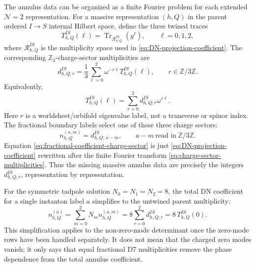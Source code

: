 \documentclass[11pt]{article}
\newcommand{\Z}{\mathbb{Z}}
\newcommand{\Tr}{\operatorname{Tr}}
\begin{document}
The annulus data can be organized as a finite Fourier problem for each extended
\(\mathcal N=2\) representation. For a massive representation \((h,Q)\) in the parent ordered
\(I\to S\) internal Hilbert space, define the three twined traces
\begin{equation}
  T_{h,Q}^{IS}(\ell)
  =
  \Tr_{\mathcal R_{h,Q}^{IS}}\!\left(g^\ell\right),
  \qquad
  \ell=0,1,2,
  \label{eq:twined-massive-traces}
\end{equation}
where \(\mathcal R_{h,Q}^{IS}\) is the multiplicity space used in
\eqref{eq:DN-projection-coefficient}. The corresponding \(\Z_3\)-charge-sector multiplicities
are
\begin{equation}
  d_{h,Q;r}^{IS}
  =
  \frac{1}{3}\sum_{\ell=0}^{2}\omega^{-r\ell}T_{h,Q}^{IS}(\ell),
  \qquad
  r\in\Z/3\Z.
  \label{eq:charge-sector-multiplicities}
\end{equation}
Equivalently,
\begin{equation}
  T_{h,Q}^{IS}(\ell)
  =
  \sum_{r=0}^{2}d_{h,Q;r}^{IS}\omega^{r\ell}.
  \label{eq:inverse-charge-sector-transform}
\end{equation}
Here \(r\) is a worldsheet/orbifold eigenvalue label, not a transverse or spinor index. The
fractional boundary labels select one of these three charge sectors:
\begin{equation}
  n_{h,Q}^{(a,m)}
  =
  d_{h,Q;\,a-m}^{IS},
  \qquad
  a-m\ \text{read in}\ \Z/3\Z.
  \label{eq:fractional-coefficient-charge-sector}
\end{equation}
Equation \eqref{eq:fractional-coefficient-charge-sector} is just
\eqref{eq:DN-projection-coefficient} rewritten after the finite Fourier transform
\eqref{eq:charge-sector-multiplicities}. Thus the missing massive annulus data are precisely
the integers \(d_{h,Q;r}^{IS}\), representation by representation.

For the symmetric tadpole solution \(N_0=N_1=N_2=8\), the total DN coefficient for a single
instanton label \(a\) simplifies to the untwined parent multiplicity:
\begin{equation}
  n_{h,Q}^{(a)}
  =
  \sum_{m=0}^2 N_m n_{h,Q}^{(a,m)}
  =
  8\sum_{r=0}^{2}d_{h,Q;r}^{IS}
  =
  8\,T_{h,Q}^{IS}(0).
  \label{eq:symmetric-annulus-untwined-parent}
\end{equation}
This simplification applies to the non-zero-mode determinant once the zero-mode rows have been
handled separately. It does not mean that the charged zero modes vanish; it only says that equal
fractional D7 multiplicities remove the phase dependence from the total annulus coefficient.
\end{document}
